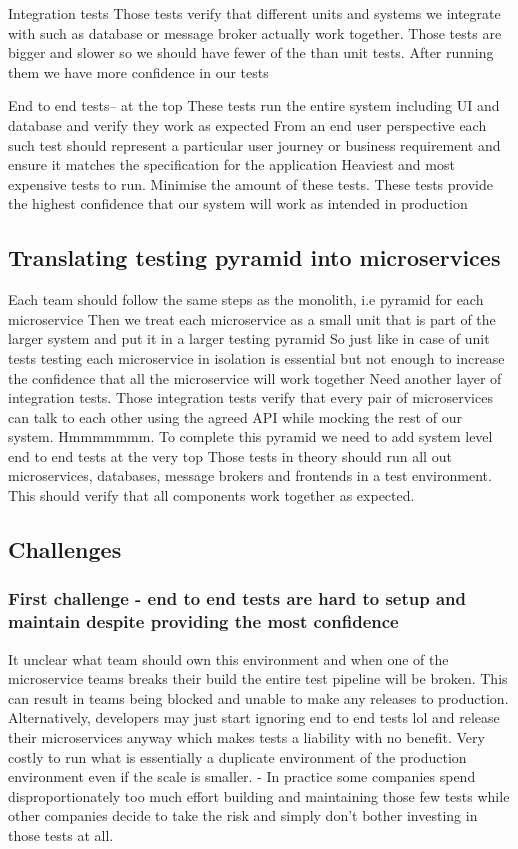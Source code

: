 \documentclass[a4paper, 11pt]{book}
\begin{document}
    Integration tests
    Those tests verify that different units and systems we integrate with such as database or message broker actually work together.
    Those tests are bigger and slower so we should have fewer of the than unit tests.
    After running them we have more confidence in our tests

    End to end tests-- at the top
    These tests run the entire system including UI and database and verify they work as expected
    From an end user perspective each such test should represent a particular user journey or business requirement and ensure it matches the specification for the application
    Heaviest and most expensive tests to run.
    Minimise the amount of these tests.
    These tests provide the highest confidence that our system will work as intended in production

    \subsection{Translating testing pyramid into microservices}
    Each team should follow the same steps as the monolith, i.e pyramid for each microservice
    Then we treat each microservice as a small unit that is part of the larger system and put it in a larger testing pyramid
    So just like in case of unit tests testing each microservice in isolation is essential but not enough to increase the confidence that all the microservice will work together
    Need another layer of integration tests.
    Those integration tests verify that every pair of microservices can talk to each other using the agreed API while mocking the rest of our system. Hmmmmmmm.
    To complete this pyramid we need to add system level end to end tests at the very top
    Those tests in theory should run all out microservices, databases, message brokers and frontends in a test environment.
    This should verify that all components work together as expected.

    \subsection{Challenges}
    \subsubsection{First challenge - end to end tests are hard to setup and maintain despite providing the most confidence}
    It unclear what team should own this environment and when one of the microservice teams breaks their build the entire test pipeline will be broken.
    This can result in teams being blocked and unable to make any releases to production.
    Alternatively, developers may just start ignoring end to end tests lol and release their microservices anyway which makes tests a liability with no benefit.
    Very costly to run what is essentially a duplicate environment of the production environment even if the scale is smaller.
    - In practice some companies spend disproportionately too much effort building and maintaining those few tests while other companies decide to take the risk and simply don't bother investing in those tests at all.
\end{document}
